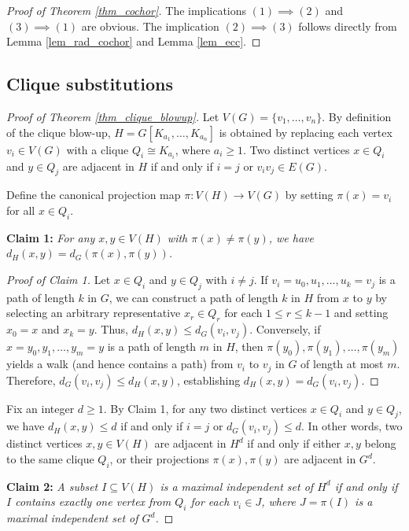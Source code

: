 \documentclass[12pt]{amsart}
\numberwithin{equation}{section}
\theoremstyle{definition}
\begin{document}
\begin{proof}[Proof of Theorem \ref{thm_cochor}] 
The implications $(1) \implies (2)$ and $(3) \implies (1)$ are obvious. The implication $(2) \implies (3)$ follows directly from Lemma \ref{lem_rad_cochor} and Lemma \ref{lem_ecc}.
\end{proof}

\subsection{Clique substitutions}
\begin{proof}[Proof of Theorem \ref{thm_clique_blowup}]
Let $V(G) = \{v_1, \ldots, v_n\}$. By definition of the clique blow-up, $H = G[K_{a_1}, \ldots, K_{a_n}]$ is obtained by replacing each vertex $v_i \in V(G)$ with a clique $Q_i \cong K_{a_i}$, where $a_i \ge 1$. Two distinct vertices $x \in Q_i$ and $y \in Q_j$ are adjacent in $H$ if and only if $i = j$ or $v_i v_j \in E(G)$.

Define the canonical projection map $\pi: V(H) \to V(G)$ by setting $\pi(x) = v_i$ for all $x \in Q_i$.

\smallskip
\noindent\textbf{Claim 1:} \emph{For any $x, y \in V(H)$ with $\pi(x) \neq \pi(y)$, we have $d_H(x, y) = d_G(\pi(x), \pi(y))$.}

\begin{proof}[Proof of Claim 1]
Let $x \in Q_i$ and $y \in Q_j$ with $i \neq j$. If $v_i = u_0, u_1, \dots, u_k = v_j$ is a path of length $k$ in $G$, we can construct a path of length $k$ in $H$ from $x$ to $y$ by selecting an arbitrary representative $x_r \in Q_{r}$ for each $1 \le r \le k-1$ and setting $x_0 = x$ and $x_k = y$. Thus, $d_H(x, y) \le d_G(v_i, v_j)$. Conversely, if $x = y_0, y_1, \dots, y_m = y$ is a path of length $m$ in $H$, then $\pi(y_0), \pi(y_1), \dots, \pi(y_m)$ yields a walk (and hence contains a path) from $v_i$ to $v_j$ in $G$ of length at most $m$. Therefore, $d_G(v_i, v_j) \le d_H(x, y)$, establishing $d_H(x, y) = d_G(v_i, v_j)$.
\end{proof}

Fix an integer $d \ge 1$. By Claim 1, for any two distinct vertices $x \in Q_i$ and $y \in Q_j$, we have $d_H(x, y) \le d$ if and only if $i = j$ or $d_G(v_i, v_j) \le d$. In other words, two distinct vertices $x, y \in V(H)$ are adjacent in $H^d$ if and only if either $x, y$ belong to the same clique $Q_i$, or their projections $\pi(x), \pi(y)$ are adjacent in $G^d$.

\smallskip
\noindent\textbf{Claim 2:} \emph{A subset $I \subseteq V(H)$ is a maximal independent set of $H^d$ if and only if $I$ contains exactly one vertex from $Q_i$ for each $v_i \in J$, where $J = \pi(I)$ is a maximal independent set of $G^d$.}


\end{proof}
\end{document}
